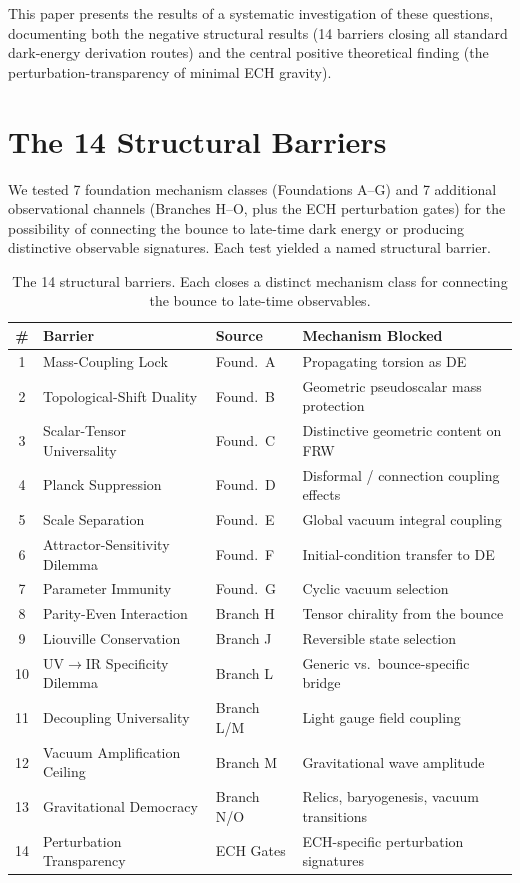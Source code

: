 \documentclass[a4paper,11pt]{article}
\begin{document}
This paper presents the results of a systematic investigation of these questions, documenting both the negative structural results (14 barriers closing all standard dark-energy derivation routes) and the central positive theoretical finding (the perturbation-transparency of minimal ECH gravity).

\section{The 14 Structural Barriers}

We tested 7 foundation mechanism classes (Foundations A--G) and 7 additional observational channels (Branches H--O, plus the ECH perturbation gates) for the possibility of connecting the bounce to late-time dark energy or producing distinctive observable signatures. Each test yielded a named structural barrier.

\begin{table}[h]
\centering
\small
\begin{tabular}{clll}
\toprule
\# & Barrier & Source & Mechanism Blocked \\
\midrule
1 & Mass-Coupling Lock & Found.\ A & Propagating torsion as DE \\
2 & Topological-Shift Duality & Found.\ B & Geometric pseudoscalar mass protection \\
3 & Scalar-Tensor Universality & Found.\ C & Distinctive geometric content on FRW \\
4 & Planck Suppression & Found.\ D & Disformal / connection coupling effects \\
5 & Scale Separation & Found.\ E & Global vacuum integral coupling \\
6 & Attractor-Sensitivity Dilemma & Found.\ F & Initial-condition transfer to DE \\
7 & Parameter Immunity & Found.\ G & Cyclic vacuum selection \\
8 & Parity-Even Interaction & Branch H & Tensor chirality from the bounce \\
9 & Liouville Conservation & Branch J & Reversible state selection \\
10 & UV$\to$IR Specificity Dilemma & Branch L & Generic vs.\ bounce-specific bridge \\
11 & Decoupling Universality & Branch L/M & Light gauge field coupling \\
12 & Vacuum Amplification Ceiling & Branch M & Gravitational wave amplitude \\
13 & Gravitational Democracy & Branch N/O & Relics, baryogenesis, vacuum transitions \\
14 & Perturbation Transparency & ECH Gates & ECH-specific perturbation signatures \\
\bottomrule
\end{tabular}
\caption{The 14 structural barriers. Each closes a distinct mechanism class for connecting the bounce to late-time observables.}
\label{tab:barriers}
\end{table}
\end{document}
